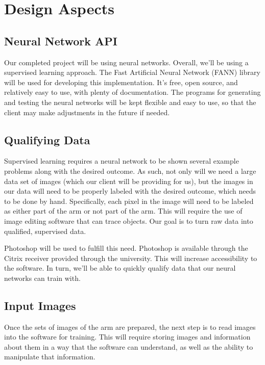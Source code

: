 \documentclass[10pt,journal,compsoc, draftclsnofoot,onecolumn]{IEEEtran}
\begin{document}
\section{Design Aspects}
\subsection{Neural Network API}
Our completed project will be using neural networks. Overall, we'll be using a supervised learning approach.
The Fast Artificial Neural Network (FANN) library will be used for developing this implementation.
It's free, open source, and relatively easy to use, with plenty of documentation.
The programs for generating and testing the neural networks will be kept flexible and easy to use, so that the client may make adjustments in the future if needed.

\subsection{Qualifying Data}
Supervised learning requires a neural network to be shown several example problems along with the desired outcome.
As such, not only will we need a large data set of images (which our client will be providing for us), but the images in our data will need to be properly labeled with the desired outcome, which needs to be done by hand.
Specifically, each pixel in the image will need to be labeled as either part of the arm or not part of the arm.
This will require the use of image editing software that can trace objects.
Our goal is to turn raw data into qualified, supervised data.

Photoshop will be used to fulfill this need.
Photoshop is available through the Citrix receiver provided through the university.
This will increase accessibility to the software. In turn, we'll be able to quickly qualify data that our neural networks can train with.

\subsection{Input Images}
Once the sets of images of the arm are prepared, the next step is to read images into the software for training.
This will require storing images and information about them in a way that the software can understand, as well as the ability to manipulate that information.
\end{document}

